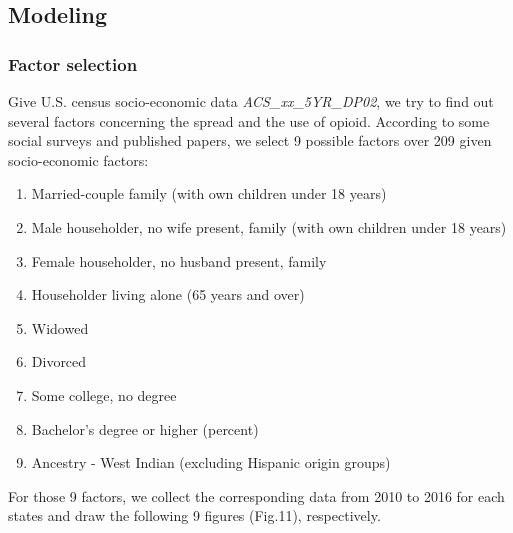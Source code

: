 \documentclass[12pt]{article}
\begin{document}
\subsection{Modeling}

\subsubsection{Factor selection}
 Give U.S. census socio-economic data \textit{ACS\_xx\_5YR\_DP02}, we try to find out several factors concerning the spread and the use of opioid. According to some social surveys and published papers, we select 9 possible factors over 209 given socio-economic factors: 
 \begin{enumerate}[\bfseries (1)]
     \item Married-couple family (with own children under 18 years)
     \item Male householder, no wife present, family (with own children under 18 years)
     \item Female householder, no husband present, family
     \item Householder living alone (65 years and over)
     \item Widowed
     \item Divorced
     \item Some college, no degree
     \item Bachelor's degree or higher (percent)
     \item Ancestry - West Indian (excluding Hispanic origin groups)
 \end{enumerate}
 For those 9 factors, we collect the corresponding data from 2010 to 2016 for each states and draw the following 9 figures (Fig.11), respectively.
\end{document}
